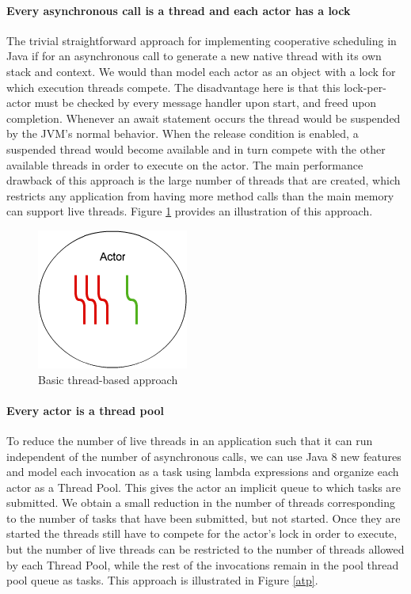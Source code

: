 \paragraph{Every asynchronous call is a thread and each actor has a lock }
The trivial straightforward approach for implementing cooperative scheduling in Java if for an asynchronous call to generate a new native thread with its own stack and context. We would than model each actor as an object with a lock for which execution threads compete. The disadvantage here is that this lock-per-actor must be checked by every message handler upon start, and freed upon completion. Whenever an await statement occurs the thread would be suspended by the JVM's normal behavior. When the release condition is enabled, a suspended thread would become available and in turn compete with the other available threads in order to execute on the actor. The main performance drawback of this approach is the large number of threads that are created, which restricts any application from having more method calls than the main memory can support live threads. Figure \ref{tp} provides an illustration of this approach.

\begin{figure}
	\label{tp}
	\centering
	\includegraphics[scale=0.7]{mt.png}
	\caption{Basic thread-based approach}
\end{figure}

\paragraph{Every actor is a thread pool}
To reduce the number of live threads in an application such that it can run independent of the number of asynchronous calls, we can use Java 8 new features and model each invocation as a task using lambda expressions and organize each actor as a Thread Pool. This gives the actor an implicit queue to which tasks are submitted. We obtain a small reduction in the number of threads corresponding to the number of tasks that have been submitted, but not started.  Once they are started the threads still have to compete for the actor's lock in order to execute, but the number of live threads can be restricted to the number of threads allowed by each Thread Pool, while the rest of the invocations remain in the pool thread pool queue as tasks. This approach is illustrated in Figure \ref{atp}. 


